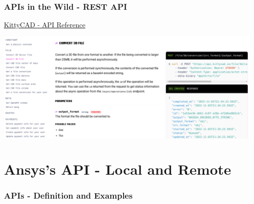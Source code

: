 \documentclass[t]{beamer}
\begin{document}
\begin{frame}
  \frametitle{APIs in the Wild - REST API}
  \vspace{-10pt}

  \href{https://kittycad.io/docs/api/}{KittyCAD - API Reference}

  \centering
  \includegraphics[height=.75\textheight]{./figures/kittycad_api.png}

\end{frame}






\section{Ansys's API - Local and Remote}

\begin{frame}
  \frametitle{APIs - Definition and Examples}
  \tableofcontents[currentsection]
  \vspace{200pt}  %
\end{frame}
\end{document}
